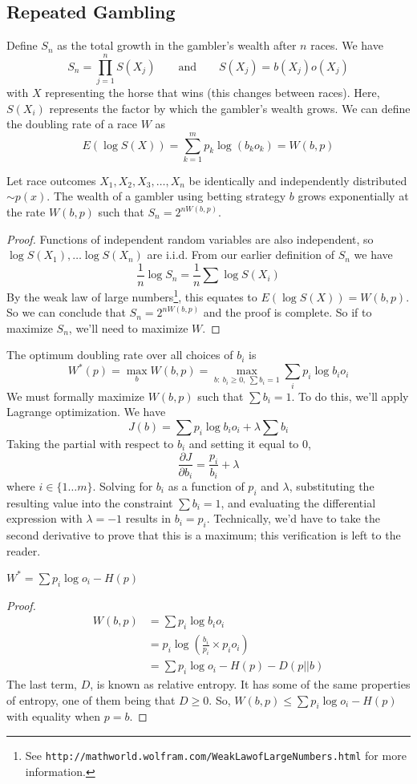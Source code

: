 \documentclass[11pt]{article}
\theoremstyle{definition}
\begin{document}
\subsection{Repeated Gambling}

Define $S_n$ as the total growth in the gambler's wealth after $n$ races. We have $$S_n = \prod_{j=1}^n S(X_j) \qquad \text{and} \qquad S(X_j) = b(X_j) o(X_j)$$with $X$ representing the horse that wins (this changes between races). Here, $S(X_i)$ represents the factor by which the gambler's wealth grows. We can define the doubling rate of a race $W$ as $$E(\log S(X)) = \sum_{k=1}^m p_k \log (b_k o_k) = W(b, p)$$

\theorem Let race outcomes $X_1, X_2, X_3, \dots, X_n$ be identically and independently distributed $\sim p(x)$. The wealth of a gambler using betting strategy $b$ grows exponentially at the rate $W(b, p)$ such that $S_n = 2^{n W(b, p)}$.

\begin{proof}
Functions of independent random variables are also independent, so $\log S(X_1), \dots \log S(X_n)$ are i.i.d. From our earlier definition of $S_n$ we have $$\frac{1}{n} \log S_n = \frac{1}{n} \sum \log S(X_i)$$By the weak law of large numbers\footnote{See \texttt{http://mathworld.wolfram.com/WeakLawofLargeNumbers.html} for more information.}, this equates to $E(\log S(X)) = W(b, p)$. So we can conclude that $S_n =  2^{n W(b, p)}$ and the proof is complete. So if to maximize $S_n$, we'll need to maximize $W$. 
\end{proof}
 The optimum doubling rate over all choices of $b_i$ is $$W^*(p) = \max_b W(b, p) = \max_{b: \: b_i \geq 0, \: \sum b_i = 1} \sum_i p_i \log b_i o_i$$We must formally maximize $W(b, p)$ such that $\sum b_i = 1$. To do this, we'll apply Lagrange optimization. We have $$J(b) = \sum p_i \log b_i o_i + \lambda \sum b_i$$Taking the partial with respect to $b_i$ and setting it equal to 0, $$\frac{\partial J}{\partial b_i} = \frac{p_i}{b_i} + \lambda$$ where $i \in \{ 1 \dots m \}$. Solving for $b_i$ as a function of $p_i$ and $\lambda$, substituting the resulting value into the constraint $\sum b_i = 1$, and evaluating the differential expression with  $\lambda = -1$ results in $b_i = p_i$. Technically, we'd have to take the second derivative to prove that this is a maximum; this verification is left to the reader. 

\theorem $W^* = \sum p_i \log o_i - H(p)$

\begin{proof}
\begin{align*}
W(b, p) &= \sum p_i \log b_i o_i  \\
&= p_i \log \left( \frac{b_i}{p_i} \times p_i o_i \right) \\
&= \sum p_i \log o_i - H(p) - D(p || b)
\end{align*}
The last term, $D$, is known as relative entropy. It has some of the same properties of entropy, one of them being that $D \geq 0$. So,  $W(b, p) \leq \sum p_i \log o_i - H(p)$ with equality when $p = b$. 
\end{proof}
\end{document}
